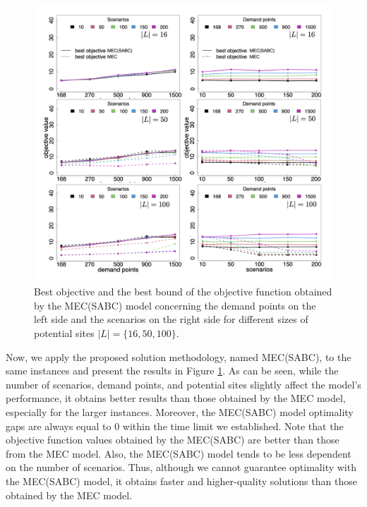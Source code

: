\begin{figure}
    \centering
    \includegraphics[width=.9\linewidth]{figures/M2M1objectiveValue.png}
    \caption{Best objective and the best bound of the objective function obtained by the MEC(SABC) model concerning the demand points on the left side and the scenarios on the right side for different sizes of potential sites $|L|=\{16,50,100\}$.}
    \label{fig:M2M1objV}
\end{figure}
Now, we apply the proposed solution methodology, named MEC(SABC), to the same instances and present the results in Figure \ref{fig:M2M1objV}.
As can be seen, while the number of scenarios, demand points, and potential sites slightly affect the model's performance, it obtains better results than those obtained by the MEC model, especially for the larger instances. Moreover, the MEC(SABC) model optimality gaps are always equal to 0 within the time limit we established. Note that the objective function values obtained by the MEC(SABC) are better than those from the MEC model. Also, the MEC(SABC) model tends to be less dependent on the number of scenarios. Thus, although we cannot guarantee optimality with the MEC(SABC) model, it obtains faster and higher-quality solutions
than those obtained by the MEC model. %





